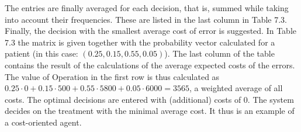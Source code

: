 \documentclass[10pt]{book}
\begin{document}
The entries are finally averaged for each decision, that is, summed while taking into account their frequencies. These are listed in the last column in Table 7.3. Finally, the decision with the smallest average cost of error is suggested. In Table 7.3 the matrix is given together with the probability vector calculated for a patient (in this case: $(0.25,0.15,0.55,0.05)$). The last column of the table contains the result of the calculations of the average expected costs of the errors. The value of Operation in the first row is thus calculated as $0.25 \cdot 0 + 0.15 \cdot 500 + 0.55 \cdot 5800 + 0.05 \cdot 6000 = 3565$, a weighted average of all costs. The optimal decisions are entered with (additional) costs of 0. The system decides on the treatment with the minimal average cost. It thus is an example of a cost-oriented agent.
\end{document}
